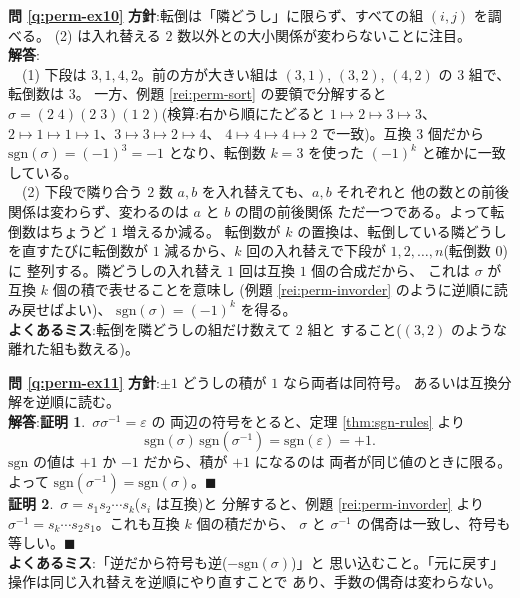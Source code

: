 \bigskip
\noindent\textbf{問 \ref{q:perm-ex10}}\quad
\textbf{方針}:転倒は「隣どうし」に限らず、すべての組 $(i, j)$ を調べる。
(2) は入れ替える $2$ 数以外との大小関係が変わらないことに注目。\\
\textbf{解答}:\\
　(1) 下段は $3, 1, 4, 2$。前の方が大きい組は
$(3, 1)$, $(3, 2)$, $(4, 2)$ の $3$ 組で、転倒数は $3$。
一方、例題 \ref{rei:perm-sort} の要領で分解すると
$\sigma = (2\;4)(2\;3)(1\;2)$(検算:右から順にたどると
$1 \mapsto 2 \mapsto 3 \mapsto 3$、
$2 \mapsto 1 \mapsto 1 \mapsto 1$、$3 \mapsto 3 \mapsto 2 \mapsto 4$、
$4 \mapsto 4 \mapsto 4 \mapsto 2$ で一致)。互換 $3$ 個だから
$\mathrm{sgn}(\sigma) = (-1)^3 = -1$ となり、転倒数 $k = 3$ を使った
$(-1)^k$ と確かに一致している。\\
　(2) 下段で隣り合う $2$ 数 $a, b$ を入れ替えても、$a, b$ それぞれと
他の数との前後関係は変わらず、変わるのは $a$ と $b$ の間の前後関係
ただ一つである。よって転倒数はちょうど $1$ 増えるか減る。
転倒数が $k$ の置換は、転倒している隣どうしを直すたびに転倒数が
$1$ 減るから、$k$ 回の入れ替えで下段が $1, 2, \dots, n$(転倒数 $0$)に
整列する。隣どうしの入れ替え $1$ 回は互換 $1$ 個の合成だから、
これは $\sigma$ が互換 $k$ 個の積で表せることを意味し
(例題 \ref{rei:perm-invorder} のように逆順に読み戻せばよい)、
$\mathrm{sgn}(\sigma) = (-1)^k$ を得る。\\
\textbf{よくあるミス}:転倒を隣どうしの組だけ数えて $2$ 組と
すること($(3, 2)$ のような離れた組も数える)。

\bigskip
\noindent\textbf{問 \ref{q:perm-ex11}}\quad
\textbf{方針}:$\pm 1$ どうしの積が $1$ なら両者は同符号。
あるいは互換分解を逆順に読む。\\
\textbf{解答}:\textbf{証明 1}.\ $\sigma\sigma^{-1} = \varepsilon$ の
両辺の符号をとると、定理 \ref{thm:sgn-rules} より
\[
\mathrm{sgn}(\sigma)\,\mathrm{sgn}(\sigma^{-1})
= \mathrm{sgn}(\varepsilon) = +1.
\]
$\mathrm{sgn}$ の値は $+1$ か $-1$ だから、積が $+1$ になるのは
両者が同じ値のときに限る。よって
$\mathrm{sgn}(\sigma^{-1}) = \mathrm{sgn}(\sigma)$。$\blacksquare$\\
\textbf{証明 2}.\ $\sigma = s_1 s_2 \cdots s_k$($s_i$ は互換)と
分解すると、例題 \ref{rei:perm-invorder} より
$\sigma^{-1} = s_k \cdots s_2 s_1$。これも互換 $k$ 個の積だから、
$\sigma$ と $\sigma^{-1}$ の偶奇は一致し、符号も等しい。$\blacksquare$\\
\textbf{よくあるミス}:「逆だから符号も逆($-\mathrm{sgn}(\sigma)$)」と
思い込むこと。「元に戻す」操作は同じ入れ替えを逆順にやり直すことで
あり、手数の偶奇は変わらない。


